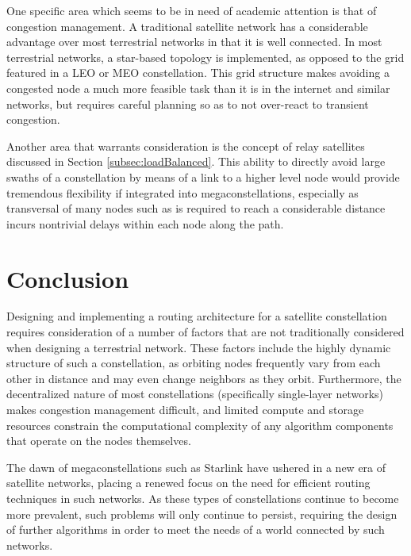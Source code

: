 One specific area which seems to be in need of academic attention is that of congestion management. A traditional satellite network has a considerable advantage over most terrestrial networks in that it is well connected. In most terrestrial networks, a star-based topology is implemented, as opposed to the grid featured in a LEO or MEO constellation. This grid structure makes avoiding a congested node a much more feasible task than it is in the internet and similar networks, but requires careful planning so as to not over-react to transient congestion.

Another area that warrants consideration is the concept of relay satellites discussed in Section \ref{subsec:loadBalanced}. This ability to directly avoid large swaths of a constellation by means of a link to a higher level node would provide tremendous flexibility if integrated into megaconstellations, especially as transversal of many nodes such as is required to reach a considerable distance incurs nontrivial delays within each node along the path.

\section{Conclusion}\label{sec:conclusion}
Designing and implementing a routing architecture for a satellite constellation requires consideration of a number of factors that are not traditionally considered when designing a terrestrial network. These factors include the highly dynamic structure of such a constellation, as orbiting nodes frequently vary from each other in distance and may even change neighbors as they orbit. Furthermore, the decentralized nature of most constellations (specifically single-layer networks) makes congestion management difficult, and limited compute and storage resources constrain the computational complexity of any algorithm components that operate on the nodes themselves.

The dawn of megaconstellations such as Starlink have ushered in a new era of satellite networks, placing a renewed focus on the need for efficient routing techniques in such networks. As these types of constellations continue to become more prevalent, such problems will only continue to persist, requiring the design of further algorithms in order to meet the needs of a world connected by such networks.
